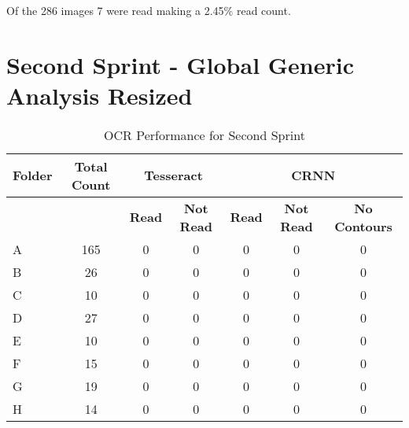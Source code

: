 Of the 286 images 7 were read making a 2.45\% read count.

\section{Second Sprint - Global Generic Analysis Resized}

\begin{table}[h]
    \centering
    \caption{OCR Performance for Second Sprint}
    \label{tab:second_print}
    \begin{tabular}{|l|c|c|c|c|c|c|}
        \hline
        \textbf{Folder} & \textbf{Total Count} & \multicolumn{2}{c|}{\textbf{Tesseract}} & \multicolumn{3}{c|}{\textbf{CRNN}}                                                            \\
        \hline
                        &                      & \textbf{Read}                           & \textbf{Not Read}                  & \textbf{Read} & \textbf{Not Read} & \textbf{No Contours} \\
        \hline
        A               & 165                  & 0                                       & 0                                  & 0             & 0                 & 0                    \\
        B               & 26                   & 0                                       & 0                                  & 0             & 0                 & 0                    \\
        C               & 10                   & 0                                       & 0                                  & 0             & 0                 & 0                    \\
        D               & 27                   & 0                                       & 0                                  & 0             & 0                 & 0                    \\
        E               & 10                   & 0                                       & 0                                  & 0             & 0                 & 0                    \\
        F               & 15                   & 0                                       & 0                                  & 0             & 0                 & 0                    \\
        G               & 19                   & 0                                       & 0                                  & 0             & 0                 & 0                    \\
        H               & 14                   & 0                                       & 0                                  & 0             & 0                 & 0                    \\
        \hline
    \end{tabular}
\end{table}


